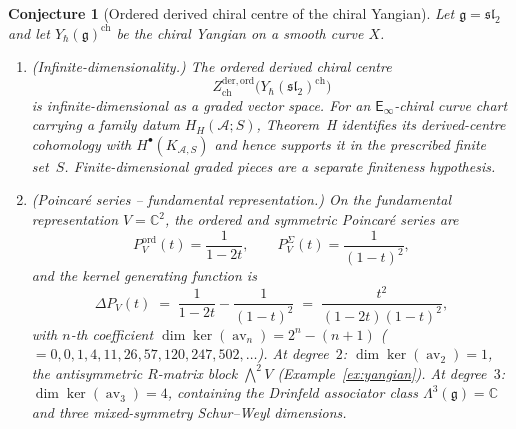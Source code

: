 \documentclass[11pt,reqno]{amsart}
\newtheorem{conjecture}[theorem]{Conjecture}
\theoremstyle{definition}
\theoremstyle{remark}
\newcommand{\cA}{\mathcal{A}}
\newcommand{\Einf}{\mathsf{E}_{\infty}}
\DeclareMathOperator{\av}{av}
\newcommand{\fg}{\mathfrak{g}}
\newcommand{\CC}{\mathbb{C}}
\numberwithin{equation}{section}
\begin{document}
\begin{conjecture}[Ordered derived chiral centre of the
chiral Yangian]
\label{conj:yangian-ordered-center}
Let $\fg = \mathfrak{sl}_2$ and let
$Y_\hbar(\fg)^{\mathrm{ch}}$ be the chiral Yangian on a
smooth curve $X$.
\begin{enumerate}[label=\textup{(\roman*)}]
\item \textup{(Infinite-dimensionality.)}
  The ordered derived chiral centre
  \[
    Z^{\mathrm{der,ord}}_{\mathrm{ch}}\bigl(
      Y_\hbar(\mathfrak{sl}_2)^{\mathrm{ch}}\bigr)
  \]
  is infinite-dimensional as a graded vector space.
  For an $\Einf$-chiral curve chart carrying a family datum
  $H_H(\cA;S)$, Theorem~H identifies its derived-centre
  cohomology with $H^\bullet(K_{\cA,S})$ and hence supports it
  in the prescribed finite set~$S$.  Finite-dimensional graded
  pieces are a separate finiteness hypothesis.

\item \textup{(Poincar\'e series -- fundamental
  representation.)}
  On the fundamental representation $V = \CC^2$, the
  ordered and symmetric Poincar\'e series are
  \[
    P^{\mathrm{ord}}_V(t) = \frac{1}{1 - 2t},
    \qquad
    P^{\Sigma}_V(t) = \frac{1}{(1-t)^2},
  \]
  and the kernel generating function is
  \begin{equation}\label{eq:conj-kernel-gf-fund}
    \Delta P_V(t)
    \;=\; \frac{1}{1 - 2t} - \frac{1}{(1-t)^2}
    \;=\; \frac{t^2}{(1 - 2t)(1-t)^2},
  \end{equation}
  with $n$-th coefficient
  $\dim\ker(\av_n) = 2^n - (n+1)$
  \textup{(}$= 0, 0, 1, 4, 11, 26, 57, 120, 247,
  502, \ldots$\textup{)}.
  At degree~$2$: $\dim\ker(\av_2) = 1$, the
  antisymmetric $R$-matrix block $\bigwedge^2 V$
  \textup{(Example~\ref{ex:yangian})}.
  At degree~$3$: $\dim\ker(\av_3) = 4$, containing the
  Drinfeld associator class $\Lambda^3(\fg) = \CC$ and
  three mixed-symmetry Schur--Weyl dimensions.


\end{enumerate}
\end{conjecture}
\end{document}
